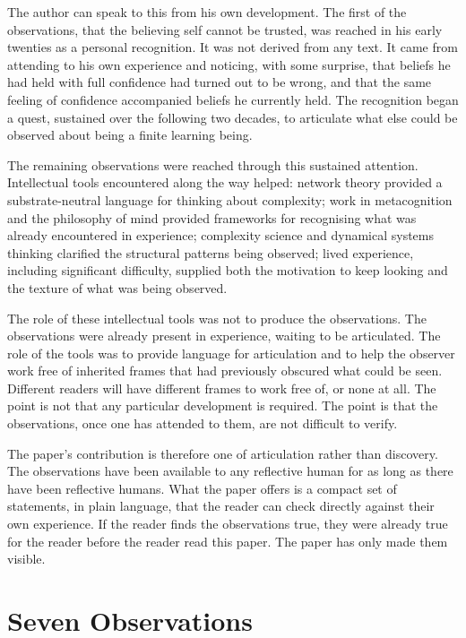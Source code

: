 \documentclass[11pt]{article}
\begin{document}
The author can speak to this from his own development. The first of
the observations, that the believing self cannot be trusted, was
reached in his early twenties as a personal recognition. It was not
derived from any text. It came from attending to his own experience
and noticing, with some surprise, that beliefs he had held with full
confidence had turned out to be wrong, and that the same feeling of
confidence accompanied beliefs he currently held. The recognition
began a quest, sustained over the following two decades, to articulate
what else could be observed about being a finite learning being.

The remaining observations were reached through this sustained
attention. Intellectual tools encountered along the way helped:
network theory provided a substrate-neutral language for thinking
about complexity; work in metacognition and the philosophy of mind
provided frameworks for recognising what was already encountered in
experience; complexity science and dynamical systems thinking
clarified the structural patterns being observed; lived experience,
including significant difficulty, supplied both the motivation to
keep looking and the texture of what was being observed.

The role of these intellectual tools was not to produce the
observations. The observations were already present in experience,
waiting to be articulated. The role of the tools was to provide
language for articulation and to help the observer work free of
inherited frames that had previously obscured what could be seen.
Different readers will have different frames to work free of, or
none at all. The point is not that any particular development is
required. The point is that the observations, once one has attended
to them, are not difficult to verify.

The paper's contribution is therefore one of articulation rather than
discovery. The observations have been available to any reflective
human for as long as there have been reflective humans. What the
paper offers is a compact set of statements, in plain language, that
the reader can check directly against their own experience. If the
reader finds the observations true, they were already true for the
reader before the reader read this paper. The paper has only made
them visible.

\section{Seven Observations}
\end{document}
